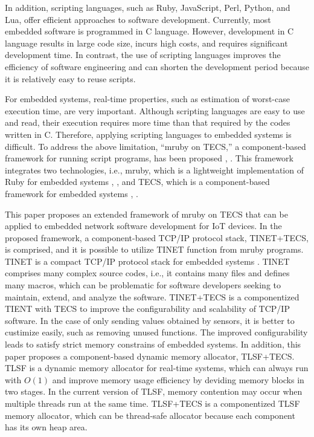 \documentclass[JIP]{ipsj_v2/UTF8/ipsj}
\begin{document}
In addition, scripting languages, such as Ruby, JavaScript, Perl, Python, and Lua, offer efficient approaches to software development.
Currently, most embedded software is programmed in C language.
However, development in C language results in large code size, incurs high costs, and requires significant development time.
In contrast, the use of scripting languages improves the efficiency of software engineering and can shorten the development period because it is relatively easy to reuse scripts. 

For embedded systems, real-time properties, such as estimation of worst-case execution time, are very important.
Although scripting languages are easy to use and read, their execution requires more time than that required by the codes written in C.
Therefore, applying scripting languages to embedded systems is difficult.
To address the above limitation, ``mruby on TECS,'' a component-based framework for running script programs, has been proposed \cite{par:mrubyonTECS}, \cite{mrubyonTECS3}.
This framework integrates two technologies, i.e., mruby, which is a lightweight implementation of Ruby for embedded systems \cite{par:mruby}, \cite{url:mruby}, and TECS, which is a component-based framework for embedded systems \cite{par:TECS}, \cite{url:TOPPERS}.

This paper proposes an extended framework of mruby on TECS that can be applied to embedded network software development for IoT devices.
In the proposed framework, a component-based TCP/IP protocol stack, TINET+TECS, is comprised, and it is possible to utilize TINET function from mruby programs.
TINET is a compact TCP/IP protocol stack for embedded systems \cite{url:TINET}.
TINET comprises many complex source codes, i.e., it contains many files and defines many macros, which can be problematic for software developers seeking to maintain, extend, and analyze the software.
TINET+TECS is a componentized TIENT with TECS to improve the configurability and scalability of TCP/IP software.
In the case of only sending values obtained by sensors, it is better to custimize easily, such as removing unused functions.
The improved configurability leads to satisfy strict memory constrains of embedded systems.
In addition, this paper proposes a component-based dynamic memory allocator, TLSF+TECS. 
TLSF is a dynamic memory allocator for real-time systems, which can always run with $O(1)$ and improve memory usage efficiency by deviding memory blocks in two stages.
In the current version of TLSF, memory contention may occur when multiple threads run at the same time.
TLSF+TECS is a componentized TLSF memory allocator, which can be thread-safe allocator because each component has its own heap area.
\end{document}
